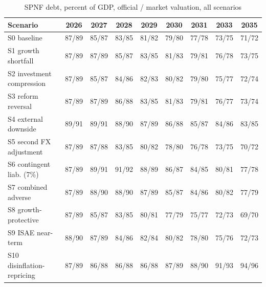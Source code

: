 \begin{table}[h]\centering\footnotesize
\caption{SPNF debt, percent of GDP, official / market valuation, all scenarios}
\begin{tabular}{lcccccccc}
\toprule
Scenario & 2026 & 2027 & 2028 & 2029 & 2030 & 2031 & 2033 & 2035\\
\midrule
S0 baseline & 87/89 & 85/87 & 83/85 & 81/82 & 79/80 & 77/78 & 73/75 & 71/72\\
S1 growth shortfall & 87/89 & 87/89 & 85/87 & 83/85 & 81/83 & 79/81 & 76/78 & 73/75\\
S2 investment compression & 87/89 & 85/87 & 84/86 & 82/83 & 80/82 & 79/80 & 75/77 & 72/74\\
S3 reform reversal & 87/89 & 87/89 & 86/88 & 83/85 & 81/83 & 79/81 & 76/77 & 73/74\\
S4 external downside & 89/91 & 89/91 & 88/90 & 87/89 & 86/88 & 85/87 & 84/86 & 83/85\\
S5 second FX adjustment & 87/89 & 87/88 & 83/85 & 80/82 & 78/80 & 76/78 & 73/75 & 70/72\\
S6 contingent liab. (7\%) & 87/89 & 89/91 & 91/92 & 88/89 & 86/87 & 84/85 & 80/81 & 77/78\\
S7 combined adverse & 87/89 & 88/90 & 88/90 & 87/89 & 85/87 & 84/86 & 80/82 & 77/79\\
S8 growth-protective & 87/89 & 85/87 & 83/85 & 80/81 & 77/79 & 75/77 & 72/73 & 69/70\\
S9 ISAE near-term & 88/90 & 87/89 & 84/86 & 82/84 & 80/82 & 78/80 & 75/76 & 72/73\\
S10 disinflation-repricing & 87/89 & 86/88 & 86/88 & 86/88 & 87/89 & 88/90 & 91/93 & 94/96\\
\bottomrule
\end{tabular}
\end{table}